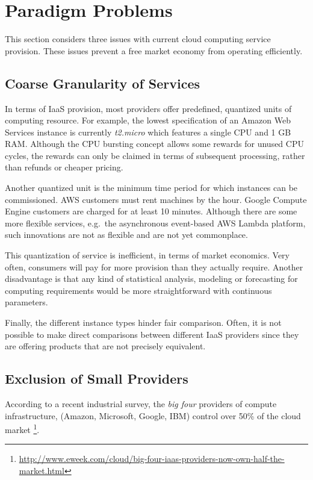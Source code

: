 \documentclass[conference,10pt]{IEEEtran}
\begin{document}

\section{Paradigm Problems}

This section considers three issues with current cloud computing service provision.
These issues prevent a free market economy from operating efficiently.


\subsection{Coarse Granularity of Services}

In terms of IaaS provision, most providers offer predefined, quantized units of computing resource. For example, the lowest specification of an Amazon Web Services instance is currently \emph{t2.micro} which features a single CPU and 1 GB RAM. Although the CPU bursting concept allows some rewards for unused CPU cycles, the rewards can only be claimed in terms of subsequent processing, rather than refunds or cheaper pricing.  

Another quantized unit is the minimum time period for which instances can be commissioned. AWS customers must rent machines by the hour. Google Compute Engine customers are charged for at least 10 minutes.
Although there are some more flexible services, e.g.\ the asynchronous event-based AWS Lambda platform, such innovations are not as flexible and are not yet commonplace.

This quantization of service is inefficient, in terms of market economics. Very often, consumers will pay for more provision than they actually require. Another disadvantage is that any kind of statistical analysis, modeling or forecasting for computing requirements would be more straightforward with continuous parameters. 

Finally, the different instance types hinder fair comparison. Often, it is not possible to make direct comparisons between different IaaS providers since they are offering products that are not precisely equivalent.


\subsection{Exclusion of Small Providers}

According to a recent industrial survey, the \emph{big four} providers of compute infrastructure, (Amazon, Microsoft, Google, IBM) control over 50\% of the cloud market \footnote{\url{http://www.eweek.com/cloud/big-four-iaas-providers-now-own-half-the-market.html}}.
\end{document}
